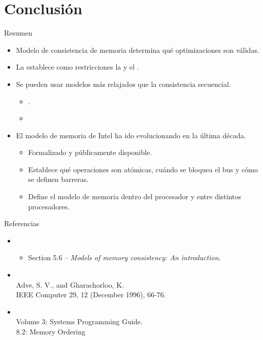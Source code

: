 \section{Conclusión}

\begin{frame}[t]{Resumen}
\begin{itemize}
  \item Modelo de consistencia de memoria determina qué optimizaciones son válidas.
  \item La  establece como restricciones la
         y el .
  \item Se pueden usar modelos más relajados que la consistencia secuencial.
    \begin{itemize}
      \item {}.
      \item {}
    \end{itemize}
  \item El modelo de memoria de Intel ha ido evolucionando en la última década.
    \begin{itemize}
      \item Formalizado y públicamente disponible.
      \item Establece qué operaciones son atómicas, cuándo se bloquea el bus y cómo se definen barreras.
      \item Define el modelo de memoria dentro del procesador y entre distintos procesadores.
    \end{itemize}
\end{itemize}
\end{frame}


\begin{frame}[t]{Referencias}
\begin{itemize}
  \item \bibhennessy
    \begin{itemize}
      \item Section 5.6 -- \emph{Models of memory consistency: An introduction}.
    \end{itemize}

  \item {}\\
        Adve, S. V., and Gharachorloo, K.\\
        IEEE Computer 29, 12 (December 1996), 66-76.

  \item {}\\
        Volume 3: Systems Programming Guide.\\
        8.2: Memory Ordering

\end{itemize}
\end{frame}
